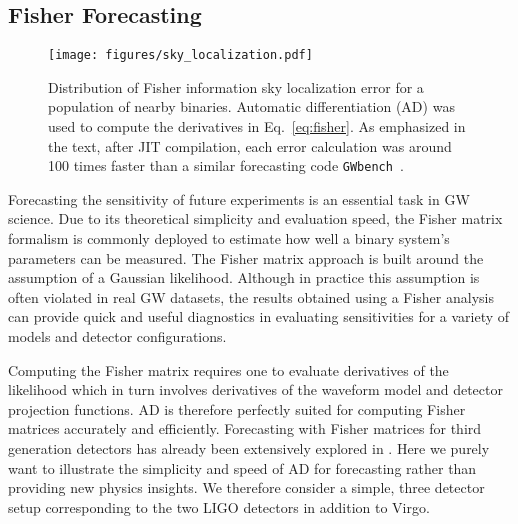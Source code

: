 \documentclass[twocolumn]{aastex631}
\begin{document}
\subsection{Fisher Forecasting}
\label{subsec:fisher}

\begin{figure}[t!]
    \centering
    \texttt{[image: figures/sky\_localization.pdf]}
    \caption{
        Distribution of Fisher information sky localization error for a population of nearby binaries.
        Automatic differentiation (AD) was used to compute the derivatives in Eq.~\ref{eq:fisher}.
        As emphasized in the text, after JIT compilation, each error calculation was around 100 times faster than a similar forecasting code \texttt{GWbench}~\citep{Borhanian:2020ypi}.
    }
    \label{fig:sky_localization}
\end{figure}

Forecasting the sensitivity of future experiments is an essential task in GW science.
Due to its theoretical simplicity and evaluation speed, the Fisher matrix formalism is commonly deployed to estimate how well a binary system's parameters can be measured.
The Fisher matrix approach is built around the assumption of a Gaussian likelihood.
Although in practice this assumption is often violated in real GW datasets, the results obtained using a Fisher analysis can provide quick and useful diagnostics in evaluating sensitivities for a variety of models and detector configurations.

Computing the Fisher matrix requires one to evaluate derivatives of the likelihood which in turn involves derivatives of the waveform model and detector projection functions.
AD is therefore perfectly suited for computing Fisher matrices accurately and efficiently. 
Forecasting with Fisher matrices for third generation detectors has already been extensively explored in \citep{Iacovelli:2022bbs, Iacovelli:2022mbg}.
Here we purely want to illustrate the simplicity and speed of AD for forecasting rather than providing new physics insights.
We therefore consider a simple, three detector setup corresponding to the two LIGO detectors in addition to Virgo.
\end{document}
